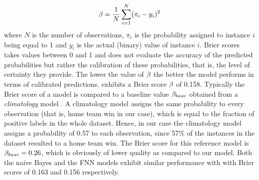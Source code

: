 \documentclass{sig-alternate}
\begin{document}
\begin{equation}
\beta = \dfrac{1}{N}\sum_{i=1}^N (\pi_i-y_i)^2
\label{eq:brier}
\end{equation}
where $N$ is the number of observations, $\pi_i$ is the probability assigned to instance $i$ being equal to 1 and $y_i$ is the actual (binary) value of instance $i$.  
Brier scores takes values between 0 and 1 and does not evaluate the accuracy of the predicted probabilities but rather the calibration of these probabilities, that is, the level of certainty they provide.  %
The lower the value of $\beta$ the better the model performs in terms of calibrated predictions. 
{\method} exhibits a Brier score $\beta$ of 0.158.  
Typically the Brier score of a model is compared to a baseline value $\beta_{base}$ obtained from a {\em climatology} model \cite{mason2004using}. 
A climatology model assigns the same probability to every observation (that is, home team win in our case), which is equal to the fraction of positive labels in the whole dataset.  
Hence, in our case the climatology model assigns a probability of 0.57 to each observation, since 57\% of the instances in the dataset resulted to a home team win. 
The Brier score for this reference model is $\beta_{base}=0.26$, which is obviously of lower quality as compared to our model. 
Both the naive Bayes and the FNN models exhibit similar performance with {\method} with Brier scores of 0.163 and 0.156 respectively. 
\end{document}
